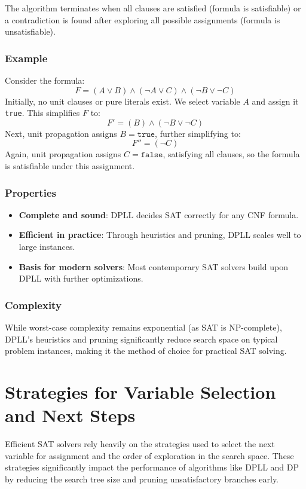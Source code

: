 \documentclass{article}
\begin{document}
The algorithm terminates when all clauses are satisfied (formula is satisfiable) or a contradiction is found after exploring all possible assignments (formula is unsatisfiable).

\subsubsection{Example}
Consider the formula:
\[
F = (A \lor B) \land (\neg A \lor C) \land (\neg B \lor \neg C)
\]
Initially, no unit clauses or pure literals exist. We select variable \(A\) and assign it \texttt{true}. This simplifies \(F\) to:
\[
F' = (B) \land ( \neg B \lor \neg C)
\]
Next, unit propagation assigns \(B = \texttt{true}\), further simplifying to:
\[
F'' = (\neg C)
\]
Again, unit propagation assigns \(C = \texttt{false}\), satisfying all clauses, so the formula is satisfiable under this assignment.

\subsubsection{Properties}
\begin{itemize}
    \item \textbf{Complete and sound}: DPLL decides SAT correctly for any CNF formula.
    \item \textbf{Efficient in practice}: Through heuristics and pruning, DPLL scales well to large instances.
    \item \textbf{Basis for modern solvers}: Most contemporary SAT solvers build upon DPLL with further optimizations.
\end{itemize}

\subsubsection{Complexity}
While worst-case complexity remains exponential (as SAT is NP-complete), DPLL's heuristics and pruning significantly reduce search space on typical problem instances, making it the method of choice for practical SAT solving.

\section{Strategies for Variable Selection and Next Steps}

Efficient SAT solvers rely heavily on the strategies used to select the next variable for assignment and the order of exploration in the search space. These strategies significantly impact the performance of algorithms like DPLL and DP by reducing the search tree size and pruning unsatisfactory branches early.
\end{document}
